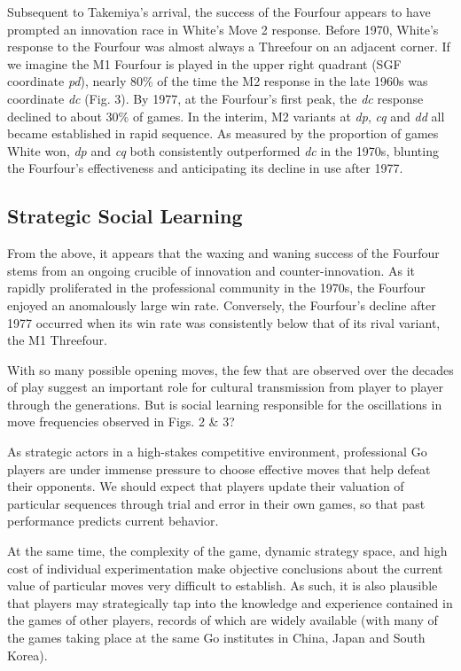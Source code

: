 \documentclass[reqno,12pt]{amsart}
\begin{document}
Subsequent to Takemiya's arrival, the success of the Fourfour appears to
have prompted an innovation race in White's Move 2 response. Before
1970, White's response to the Fourfour was almost always a Threefour on
an adjacent corner. If we imagine the M1 Fourfour is played in the upper
right quadrant (SGF coordinate \emph{pd}), nearly 80\% of the time the
M2 response in the late 1960s was coordinate \emph{dc} (Fig. 3). By
1977, at the Fourfour's first peak, the \emph{dc} response declined to
about 30\% of games. In the interim, M2 variants at \emph{dp}, \emph{cq}
and \emph{dd} all became established in rapid sequence. As measured by
the proportion of games White won, \emph{dp} and \emph{cq} both
consistently outperformed \emph{dc} in the 1970s, blunting the
Fourfour's effectiveness and anticipating its decline in use after 1977.

\subsection{Strategic Social Learning}\label{strategic-social-learning}

From the above, it appears that the waxing and waning success of the
Fourfour stems from an ongoing crucible of innovation and
counter-innovation. As it rapidly proliferated in the professional
community in the 1970s, the Fourfour enjoyed an anomalously large win
rate. Conversely, the Fourfour's decline after 1977 occurred when its
win rate was consistently below that of its rival variant, the M1
Threefour.

With so many possible opening moves, the few that are observed over the
decades of play suggest an important role for cultural transmission from
player to player through the generations. But is social learning
responsible for the oscillations in move frequencies observed in Figs. 2
\& 3?

As strategic actors in a high-stakes competitive environment,
professional Go players are under immense pressure to choose effective
moves that help defeat their opponents. We should expect that players
update their valuation of particular sequences through trial and error
in their own games, so that past performance predicts current behavior.

At the same time, the complexity of the game, dynamic strategy space,
and high cost of individual experimentation make objective conclusions
about the current value of particular moves very difficult to establish.
As such, it is also plausible that players may strategically tap into
the knowledge and experience contained in the games of other players,
records of which are widely available (with many of the games taking
place at the same Go institutes in China, Japan and South Korea).
\end{document}
